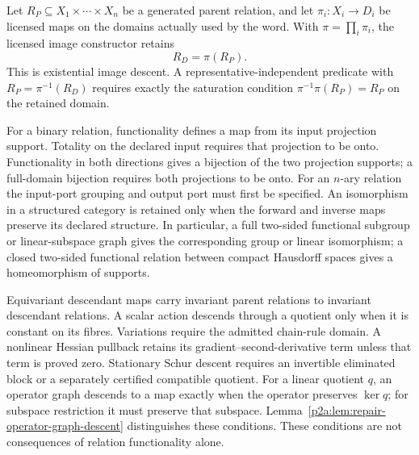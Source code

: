 \documentclass[12pt,a4paper]{article}
\begin{document}
\begin{theorem}
\label{p2a:thm:v187-pcad}
Let $R_P\subseteq X_1\times\cdots\times X_n$ be a generated parent relation,
and let $\pi_i:X_i\to D_i$ be licensed maps on the domains actually used by
the word. With $\pi=\prod_i\pi_i$, the licensed image constructor retains
\[
 \boxed{R_D=\pi(R_P).}
\]
This is existential image descent. A representative-independent predicate
with $R_P=\pi^{-1}(R_D)$ requires exactly the saturation condition
$\pi^{-1}\pi(R_P)=R_P$ on the retained domain.

For a binary relation, functionality defines a map from its input projection
support. Totality on the declared input requires that projection to be onto.
Functionality in both directions gives a bijection of the two projection
supports; a full-domain bijection requires both projections to be onto.
For an $n$-ary relation the input-port grouping and output port must first be
specified. An isomorphism in a structured category is retained only when
the forward and inverse maps preserve its declared structure. In particular,
a full two-sided functional subgroup or linear-subspace graph gives the
corresponding group or linear isomorphism; a closed two-sided functional
relation between compact Hausdorff spaces gives a homeomorphism of supports.

Equivariant descendant maps carry invariant parent relations to invariant
descendant relations. A scalar action descends through a quotient only when
it is constant on its fibres. Variations require the admitted chain-rule
domain. A nonlinear Hessian pullback retains its gradient--second-derivative
term unless that term is proved zero. Stationary Schur descent requires an
invertible eliminated block or a separately certified compatible quotient.
For a linear quotient $q$, an operator graph descends to a map exactly
when the operator preserves $\ker q$; for subspace restriction it must preserve
that subspace. Lemma~\ref{p2a:lem:repair-operator-graph-descent} distinguishes
these conditions. These conditions are not consequences of relation
functionality alone.
\end{theorem}
\end{document}
